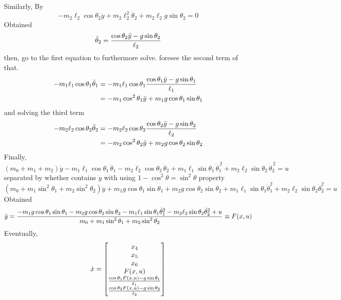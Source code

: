 \documentclass[12pt,a4paper]{article}
\begin{document}
Similarly, By
\[
-m_2\ell_2\cos\theta_2 \ddot y + m_2 \ell_2^2 \ddot \theta_2 + m_2\ell_2g\sin\theta_2 = 0
\]
Obtained
\[
\ddot\theta_2 = { \cos\theta_2\ddot y - g\sin\theta_2 \over \ell_2}
\]
then, go to the first equation to furthermore solve.
foresee the second term of that.
\begin{align*}
-m_1\ell_1\cos\theta_1 \ddot \theta_1 &= -m_1\ell_1\cos\theta_1  { \cos\theta_1 \ddot y - g\sin\theta_1  \over \ell_1} \\
&= -m_1\cos^2\theta_1 \ddot y + m_1g\cos\theta_1\sin\theta_1
\end{align*}
and solving the third term
\begin{align*}
	-m_2\ell_2\cos\theta_2\ddot\theta_2 &= 	-m_2\ell_2\cos\theta_2 { \cos\theta_2\ddot y - g\sin\theta_2 \over \ell_2} \\
	&= -m_2 \cos^2\theta_2 \ddot y + m_2g\cos\theta_2\sin\theta_2
\end{align*}
Finally, 
\[
(m_0+m_1+m_2)\ddot y
-m_1\ell_1\cos\theta_1\,\ddot\theta_1-m_2\ell_2\cos\theta_2\,\ddot\theta_2+m_1\ell_1\sin\theta_1\,\dot\theta_1^{\,2}+m_2\ell_2\sin\theta_2\,\dot\theta_2^{\,2}=u
\]
separated by whether contains $\ddot y$ with using $ 1 - \cos^2\theta = \sin^2\theta $ property
\[
(m_0 + m_1\sin^2\theta_1 + m_2\sin^2\theta_2)\ddot y + m_1g\cos\theta_1\sin\theta_1 + m_2g\cos\theta_2\sin\theta_2 + m_1\ell_1\sin\theta_1\dot\theta_1^2 + m_2\ell_2\sin\theta_2\dot\theta_2^2 = u
\]
Obtained
\[
\ddot y = { -m_1g\cos\theta_1\sin\theta_1 - m_2g\cos\theta_2\sin\theta_2 - m_1\ell_1\sin\theta_1\dot\theta_1^2 - m_2\ell_2\sin\theta_2\dot\theta_2^2 + u \over m_0 + m_1 \sin^2\theta_1 + m_2\sin^2\theta_2} \equiv F(x, u)
\]
Eventually, 
\[
\dot x = \begin{bmatrix}
	x_4 \\ x_5 \\x_6 \\
	F(x, u) \\
	{ \cos\theta_1 F(x, u) - g\sin\theta_1  \over \ell_1} \\
	{ \cos\theta_2 F(x, u) - g\sin\theta_2 \over \ell_2}
	\end{bmatrix}
\]

\end{document}
